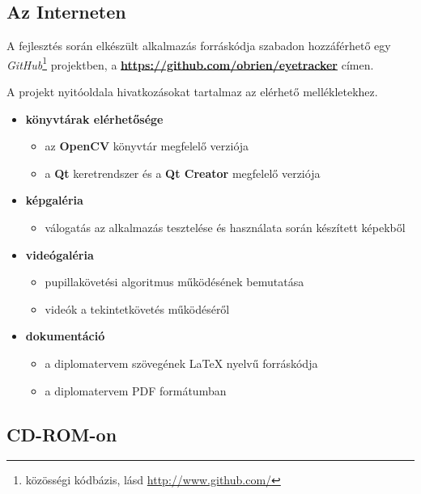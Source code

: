 \subsection{Az Interneten}\label{sect:interneten}

A fejlesztés során elkészült alkalmazás forráskódja szabadon hozzáférhető egy \emph{GitHub}\footnote{közösségi kódbázis, lásd \url{http://www.github.com/}} projektben, a \textbf{\url{https://github.com/obrien/eyetracker}} címen.

A projekt nyitóoldala hivatkozásokat tartalmaz az elérhető mellékletekhez. 

\begin{itemize}
    \item \textbf{könyvtárak elérhetősége}
    \begin{itemize}
      \item az \textbf{OpenCV} könyvtár megfelelő verziója
      \item a \textbf{Qt} keretrendszer és a \textbf{Qt Creator} megfelelő verziója
    \end{itemize}
    
  \item \textbf{képgaléria}
    \begin{itemize}
      \item válogatás az alkalmazás tesztelése és használata során készített képekből
    \end{itemize}
    
  \item \textbf{videógaléria}
    \begin{itemize}
      \item pupillakövetési algoritmus működésének bemutatása
      \item videók a tekintetkövetés működéséről
    \end{itemize}

  \item \textbf{dokumentáció}
    \begin{itemize}
      \item a diplomatervem szövegének \LaTeX{} nyelvű forráskódja
      \item a diplomatervem PDF formátumban
    \end{itemize}
\end{itemize}

\subsection{CD-ROM-on}\label{sect:cdromon}

